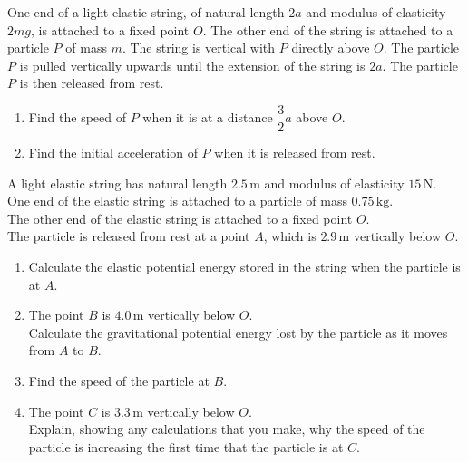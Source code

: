 \documentclass[leqno]{article}
\begin{document}
\djsFrontMatter
\begin{enumerate}[
  label=\textbf{\arabic*.},
  leftmargin=*,
  topsep=0pt,
  partopsep=0pt,
  parsep=0pt
]

\questionitem

One end of a light elastic string, of natural length $2a$ and modulus of elasticity $2mg$, is attached to a fixed point $O$. The other end of the string is attached to a particle $P$ of mass $m$. The string is vertical with $P$ directly above $O$. The particle $P$ is pulled vertically upwards until the extension of the string is $2a$. The particle $P$ is then released from rest. \\
\begin{enumerate}[label=\textbf{(\alph*)}]
  \item Find the speed of $P$ when it is at a distance $\dfrac{3}{2}a$ above $O$.  \\
  \item Find the initial acceleration of $P$ when it is released from rest.  \\
\end{enumerate}

\newpage

\questionitem

A light elastic string has natural length $2.5\,\mathrm{m}$ and modulus of elasticity $15\,\mathrm{N}$. \\

One end of the elastic string is attached to a particle of mass $0.75\,\mathrm{kg}$. \\

The other end of the elastic string is attached to a fixed point $O$. \\

The particle is released from rest at a point $A$, which is $2.9\,\mathrm{m}$ vertically below $O$. \\

\begin{enumerate}[label=\textbf{(\alph*)}]
  \item Calculate the elastic potential energy stored in the string when the particle is at $A$.  \\
  \item The point $B$ is $4.0\,\mathrm{m}$ vertically below $O$. \\
  Calculate the gravitational potential energy lost by the particle as it moves from $A$ to $B$.  \\
  \item Find the speed of the particle at $B$.  \\
  \item The point $C$ is $3.3\,\mathrm{m}$ vertically below $O$. \\
  Explain, showing any calculations that you make, why the speed of the particle is increasing the first time that the particle is at $C$.  \\
\end{enumerate}


\end{enumerate}
\end{document}
